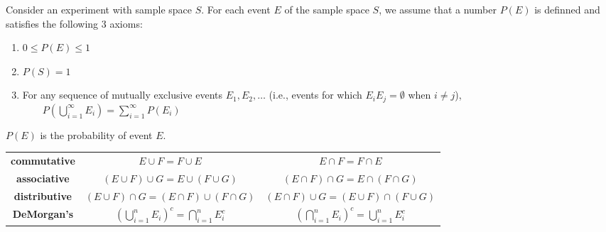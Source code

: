 \documentclass[10pt, landscape]{article}
\begin{document}
\begin{multicols*}{3}
  Consider an experiment with sample space $S$. 
  For each event $E$ of the sample space $S$, we assume that a number $P(E)$ is definned and satisfies the following 3 axioms:
  \begin{enumerate}
    \item $0 \leq P(E) \leq 1$ 
    \item $P(S) = 1$
    \item For any sequence of mutually exclusive events $E_1, E_2, \dots$ 
      (i.e., events for which $E_iE_j = \emptyset$ when  $i \neq j$),
      $\quad\quad P(\bigcup\limits^\infty_{i=1} E_i) = \sum\limits^\infty_{i=1} P(E_i)$ 
  \end{enumerate}
  $P(E)$ is the probability of event $E$.







































\end{multicols*}

\begin{center}
  \begin{tabular}{ccc}
    \textbf{commutative} & $E \cup F = F \cup E$ & $E \cap F = F \cap E$ \\
    \textbf{associative} & $(E \cup F) \cup G = E \cup (F \cup G)$ &  $(E \cap F) \cap G = E \cap (F \cap G)$ \\
    \textbf{distributive} & $(E \cup F) \cap G = (E \cap F) \cup (F \cap G)$ & $(E \cap F) \cup G = (E \cup F) \cap (F \cup G)$ \\
    \textbf{DeMorgan's} & $(\bigcup\limits^n_{i=1} E_i)^c = \bigcap\limits^n_{i=1}E_i^c$ & $(\bigcap\limits^n_{i=1}E_i)^c = \bigcup\limits^n_{i=1}E_i^c$ \\
  \end{tabular}
\end{center}
\end{document}
